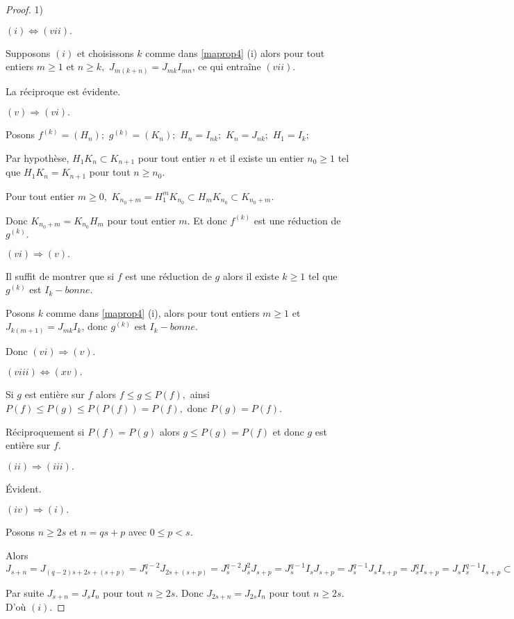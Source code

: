 \begin{proof}
	1)
	
	$(i)\Longleftrightarrow (vii).$
	
	Supposons $(i)$ et choisissons $k$ comme dans \ref{maprop4} (i) alors pour tout
	entiers $m\geq 1$ et $n\geq k,$ $J_{m(k+n)}=J_{mk}I_{mn}$, ce qui entraîne $(vii).$
	
	La réciproque est évidente.
	
	$(v)\Longrightarrow (vi).$
	
	Posons $f^{(k)}=(H_{n});$ $g^{(k)}=(K_{n});$ $H_{n}=I_{nk};$ $K_{n}=J_{nk};$ 
	$H_{1}=I_{k};$
	
	Par hypothèse, $H_{1}K_{n}\subset K_{n+1}$ pour tout entier $n$ et il
	existe un entier $n_{0}\geq 1$ tel que $H_{1}K_{n}=K_{n+1}$ pour tout $n\geq
	n_{0}.$
	
	Pour tout entier $m\geq 0,$ $K_{n_{0}+m}=H_{1}^{m}K_{n_{0}}\subset
	H_{m}K_{n_{0}}\subset K_{n_{0}+m}.$
	
	Donc $K_{n_{0}+m}=K_{n_{0}}H_{m}$ pour tout entier $m.$ Et donc $f^{(k)}$
	est une réduction de $g^{(k)}.$
	
	$(vi)\Longrightarrow (v).$
	
	Il suffit de montrer que si $f$ est une réduction de $g$ alors il existe 
	$k\geq 1$ tel que $g^{(k)}$ est $I_{k}-bonne.$
	
	Posons $k$ comme dans \ref{maprop4} (i), alors pour tout entiers $m\geq 1$ et  $J_{k(m+1)}=J_{mk}I_{k}$, donc $g^{(k)}$ est $I_{k}-bonne.$
	
	Donc $(vi)\Longrightarrow (v).$
	
	$(viii)\Longleftrightarrow (xv).$
	
	Si $g$ est entière sur $f$ alors $f\leq g\leq P(f),$ ainsi $P(f)\leq
	P(g)\leq P(P(f))=P(f),$ donc $P(g)=P(f).$
	
	Réciproquement si $P(f)=P(g)$ alors $g\leq P(g)=P(f)$ et donc $g$ est entière sur $f.$
	
	$(ii)\Longrightarrow (iii).$
	
	Évident.
	
	$(iv)\Longrightarrow (i).$
	
	Posons $n\geq 2s$ et $n=qs+p$ avec $0\leq p<s.$
	
	Alors $J_{s+n}=J_{(q-2)s+2s+(s+p)}=J_{s}^{q-2}J_{2s+(s+p)}=J_{s}^{q-2}J_{s}^{2}J_{s+p}=J_{s}^{q-1}I_{s}J_{s+p}=J_{s}^{q-1}J_{s}I_{s+p}=J_{s}^{q}I_{s+p}=J_{s}I_{s}^{q-1}I_{s+p}\subset J_{s}I_{n}\subset J_{s+n}.
	$
	
	Par suite $J_{s+n}=J_{s}I_{n}$ pour tout $n\geq 2s.$ Donc $
	J_{2s+n}=J_{2s}I_{n}$ pour tout $n\geq 2s.$ D'où $(i).$
	

\end{proof}

